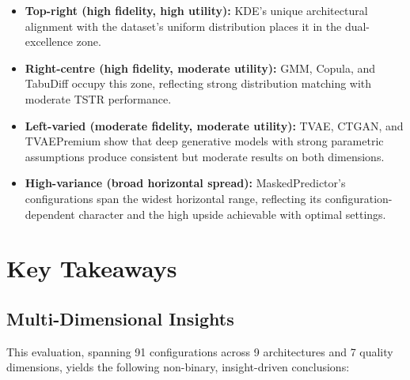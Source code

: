 \documentclass[11pt, a4paper]{report}
\begin{document}
\begin{itemize}[itemsep=5pt]
\item \textbf{Top-right (high fidelity, high utility):} KDE's unique architectural alignment with the dataset's uniform distribution places it in the dual-excellence zone.
\item \textbf{Right-centre (high fidelity, moderate utility):} GMM, Copula, and TabuDiff occupy this zone, reflecting strong distribution matching with moderate TSTR performance.
\item \textbf{Left-varied (moderate fidelity, moderate utility):} TVAE, CTGAN, and TVAEPremium show that deep generative models with strong parametric assumptions produce consistent but moderate results on both dimensions.
\item \textbf{High-variance (broad horizontal spread):} MaskedPredictor's configurations span the widest horizontal range, reflecting its configuration-dependent character and the high upside achievable with optimal settings.
\end{itemize}


\chapter{Key Takeaways}

\section{Multi-Dimensional Insights}

This evaluation, spanning 91 configurations across 9 architectures and 7 quality dimensions, yields the following non-binary, insight-driven conclusions:
\end{document}
